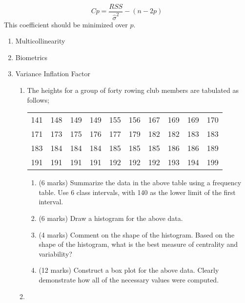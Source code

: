 \begin{equation}
Cp= \frac{RSS}{\hat{\sigma}^{2}}-(n-2p)
\end{equation}
This coefficient should be minimized over $p$.

\begin{enumerate}
	\item Multicollinearity
	\item Biometrics
	\item Variance Inflation Factor
	\begin{enumerate}
		\item The heights for a group of forty rowing club members are tabulated as follows;
		
		\begin{table}[ht]
			\begin{center}
				\begin{tabular}{|rrrrrrrrrr|}
					
					\hline
					141 & 148 & 149 & 149 & 155 & 156 & 167 & 169 & 169 & 170 \\
					171 & 173 & 175 & 176 & 177 & 179 & 182 & 182 & 183 & 183 \\
					183 & 184 & 184 & 184 & 185 & 185 & 185 & 186 & 186 & 189 \\
					191 & 191 & 191 & 191 & 192 & 192 & 192 & 193 & 194 & 199 \\
					\hline
				\end{tabular}
			\end{center}
		\end{table}
		\vspace{-0.5cm}
		\begin{enumerate}
			\item (6 marks) Summarize the data in the above table using a frequency table. Use 6 class intervals, with 140 as the lower limit of the first interval.
			\item (6 marks) Draw a histogram for the above data.
			\item (4 marks) Comment on the shape of the histogram. Based on the shape of the histogram, what is the best measure of centrality and variability?
			\item (12 marks) Construct a box plot for the above data. Clearly demonstrate how all of the necessary values were computed.
		\end{enumerate}
		\vspace{0.25cm}
		\item 
		
	\end{enumerate}
	\newpage
	
	
	
\end{enumerate}
\newpage


